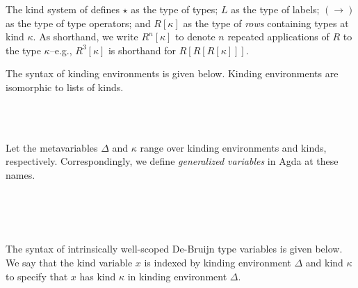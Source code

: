 \documentclass[authoryear, acmsmall, screen, review, nonacm]{acmart}
\begin{document}
The kind system of \Rome defines $\star$ as the type of types; $L$ as the type of labels; $(\to)$ as the type of type operators; and $R[\kappa]$ as the type of \emph{rows} containing types at kind $\kappa$. As shorthand, we write $R^{n}[\kappa]$ to denote $n$ repeated applications of $R$ to the type $\kappa$--e.g., $R^3[\kappa]$ is shorthand for $R[ R[ R[ \kappa ]]]$.

The syntax of kinding environments is given below. Kinding environments are isomorphic to lists of kinds.

\begin{code}%
\>[0]\AgdaSpace{}%
\AgdaSpace{}%
\AgdaSymbol{:}\AgdaSpace{}%
\AgdaSpace{}%
\<%
\\
\>[0][@{}l@{\AgdaIndent{0}}]%
\>[2]\AgdaSpace{}%
\AgdaSymbol{:}\AgdaSpace{}%
\<%
\\
%
\>[2]\AgdaOperator{\AgdaInductiveConstructor{\AgdaUnderscore{},,\AgdaUnderscore{}}}\AgdaSpace{}%
\AgdaSymbol{:}\AgdaSpace{}%
\AgdaSpace{}%
\AgdaSpace{}%
\AgdaSpace{}%
\AgdaSpace{}%
\<%
\end{code}

Let the metavariables $\Delta$ and $\kappa$ range over kinding environments and kinds, respectively. Correspondingly, we define \emph{generalized variables} in Agda at these names. 

\begin{code}%
\>[0]\<%
\\
\>[0][@{}l@{\AgdaIndent{0}}]%
\>[2]\<%
\\
\>[2][@{}l@{\AgdaIndent{0}}]%
\>[4]\AgdaSpace{}%
\AgdaSpace{}%
\AgdaSpace{}%
\AgdaSpace{}%
\AgdaSymbol{:}\AgdaSpace{}%
\<%
\\
%
\>[4]\AgdaSpace{}%
\AgdaSpace{}%
\AgdaSpace{}%
\AgdaSymbol{:}\AgdaSpace{}%
\<%
\end{code}

The syntax of intrinsically well-scoped De-Bruijn type variables is given below. We say that the kind variable $x$ is indexed by kinding environment $\Delta$ and kind $\kappa$ to specify that $x$ has kind $\kappa$ in kinding environment $\Delta$.
\end{document}
